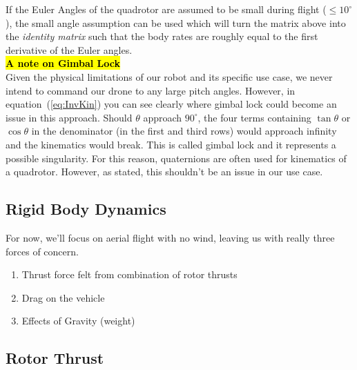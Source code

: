 \documentclass[conf]{new-aiaa}
\begin{document}
\noindent If the Euler Angles of the quadrotor are assumed to be small during flight ($\le 10^\circ$), the small angle assumption can be used which will turn the matrix above into the \textit{identity matrix} such that the body rates are roughly equal to the first derivative of the Euler angles. \vspace{0.5cm}
\\
\hl{\textbf{A note on Gimbal Lock}}\\
Given the physical limitations of our robot and its specific use case, we never intend to command our drone to any large pitch angles. However, in equation~(\ref{eq:InvKin}) you can see clearly where gimbal lock could become an issue in this approach. Should $\theta$ approach $90^\circ$, the four terms containing $\tan\theta$ or $\cos\theta$ in the denominator (in the first and third rows) would approach infinity and the kinematics would break. This is called gimbal lock and it represents a possible singularity. For this reason, quaternions are often used for kinematics of a quadrotor. However, as stated, this shouldn't be an issue in our use case.
\subsection{Rigid Body Dynamics}
For now, we'll focus on aerial flight with no wind, leaving us with really three forces of concern. 
\begin{enumerate}
    \item Thrust force felt from combination of rotor thrusts
    \item Drag on the vehicle
    \item Effects of Gravity (weight)
\end{enumerate}
\subsection{Rotor Thrust}
\end{document}

